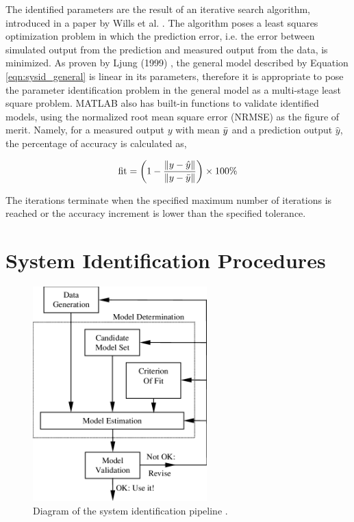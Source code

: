 The identified parameters are the result of an iterative search algorithm, introduced in a paper by Wills et al. \cite{iter_sysid_wills}. The algorithm poses a least squares optimization problem in which the prediction error, i.e. the error between simulated output from the prediction and measured output from the data, is minimized. As proven by Ljung (1999) \cite{ljung1999system}, the general model described by Equation \ref{eqn:sysid_general} is linear in its parameters, therefore it is appropriate to pose the parameter identification problem in the general model as a multi-stage least square problem. MATLAB also has built-in functions to validate identified models, using the normalized root mean square error (NRMSE) as the figure of merit. Namely, for a measured output $y$ with mean $\Bar{y}$ and a prediction output $\hat{y}$, the percentage of accuracy is calculated as, 

\begin{equation}
    \label{eqn:sysid_fit}
    \text{fit} = \left(1-\frac{\left\lVert y-\hat{y}\right\rVert}{\left\lVert y-\Bar{y}\right\rVert}\right) \times 100 \%
\end{equation}

The iterations terminate when the specified maximum number of iterations is reached or the accuracy increment is lower than the specified tolerance. %

\section{System Identification Procedures} \label{ch:sysid:proc}

\begin{figure}[ht!]
    \centering
    \includegraphics[width=0.6\textwidth]{figures/sysid_pipeline.png}
    \caption{Diagram of the system identification pipeline \cite{sysid_pipeline}.}
    \label{fig:sysid_pipeline}
\end{figure}


